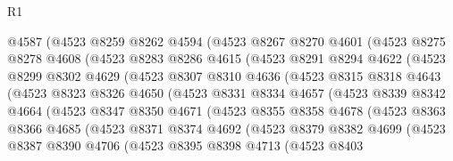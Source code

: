 \begin{lexlean}{R1}
\begin{coremodule}
          @4587
          (@4523
            @8259
            @8262
            @4594
            (@4523
              @8267
              @8270
              @4601
              (@4523
                @8275
                @8278
                @4608
                (@4523
                  @8283
                  @8286
                  @4615
                  (@4523
                    @8291
                    @8294
                    @4622
                    (@4523
                      @8299
                      @8302
                      @4629
                      (@4523
                        @8307
                        @8310
                        @4636
                        (@4523
                          @8315
                          @8318
                          @4643
                          (@4523
                            @8323
                            @8326
                            @4650
                            (@4523
                              @8331
                              @8334
                              @4657
                              (@4523
                                @8339
                                @8342
                                @4664
                                (@4523
                                  @8347
                                  @8350
                                  @4671
                                  (@4523
                                    @8355
                                    @8358
                                    @4678
                                    (@4523
                                      @8363
                                      @8366
                                      @4685
                                      (@4523
                                        @8371
                                        @8374
                                        @4692
                                        (@4523
                                          @8379
                                          @8382
                                          @4699
                                          (@4523
                                            @8387
                                            @8390
                                            @4706
                                            (@4523
                                              @8395
                                              @8398
                                              @4713
                                              (@4523
                                                @8403

\end{coremodule}
\end{lexlean}
